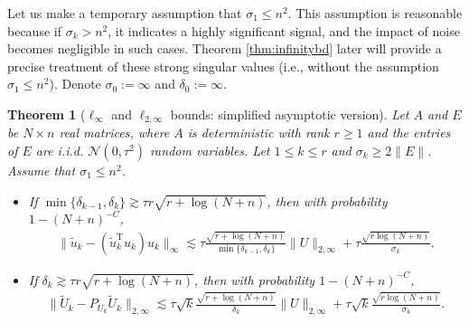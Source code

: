 \documentclass[reqno]{amsart}
\newcommand{\T}{\mathrm{T}}
\theoremstyle{plain}
\newtheorem{theorem}{Theorem}
\theoremstyle{definition}
\begin{document}
Let us make a temporary assumption that $\sigma_1 \le n^2$. This assumption is reasonable because if $\sigma_k > n^2$, it indicates a highly significant signal, and the impact of noise becomes negligible in such cases.  Theorem \ref{thm:infinitybd} later will provide a precise treatment of these strong singular values (i.e., without the assumption $\sigma_1\le n^2$). Denote $\sigma_0:=\infty$ and $\delta_0:=\infty$. 
\begin{theorem}[$\ell_\infty$ and $\ell_{2, \infty}$ bounds: simplified asymptotic version]\label{thm:entrywise} Let $A$ and $E$ be $N \times n$ real matrices, where $A$ is deterministic with rank $r \geq 1$ and the entries of $E$ are i.i.d. $\mathcal{N}(0,\tau^2)$ random variables. Let $1\le k \le r$ and $ \sigma_{k} \ge 2\|E\|$.  Assume that $\sigma_1 \le n^2$.
\begin{itemize}
\item If $\min\{\delta_{k-1},\delta_{k}\} \gtrsim  \tau r\sqrt{r+\log(N+n)}$, then with probability $1-(N+n)^{-C}$,
\begin{align*}
\| \widetilde u_{k} - (\widetilde u_{k}^\T u_{k}) u_{k}\|_\infty \lesssim   \tau \frac{\sqrt{r+\log(N+n)}}{\min\{\delta_{k-1},\delta_{k}\}}  \|U\|_{2,\infty} + \tau \frac{\sqrt{r\log(N+n)}}{\sigma_k} .
\end{align*}
\item If $\delta_{k} \gtrsim  \tau r\sqrt{r+\log(N+n)}$, then with probability $1-(N+n)^{-C}$,
\begin{align*}
\| \widetilde{U}_{k} - P_{U_{k}} \widetilde{U}_{k} \|_{2,\infty} \lesssim    \tau \sqrt{k}\frac{\sqrt{r+\log(N+n)}}{\delta_{k}}  \|U\|_{2,\infty} +  \tau \sqrt{k}\frac{\sqrt{r\log(N+n)}}{\sigma_k}.
\end{align*}
\end{itemize}
\end{theorem}
\end{document}
